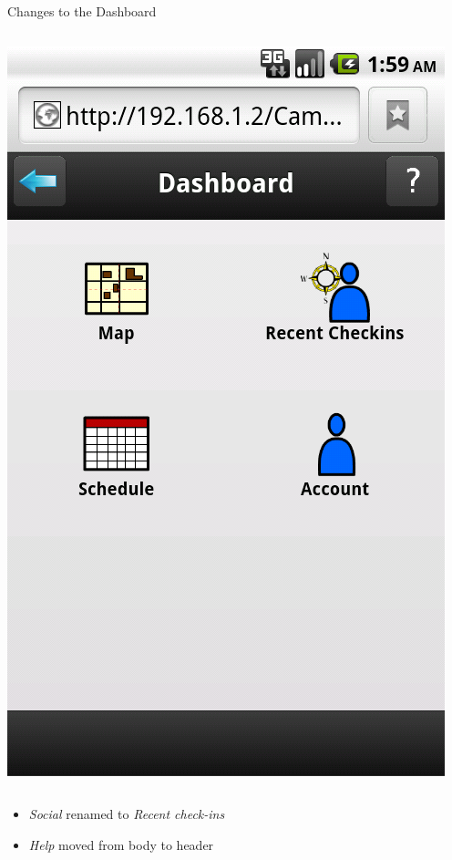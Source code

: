 \documentclass{beamer}
\begin{document}
\begin{frame}{Changes to the Dashboard}
\begin{columns}[c]
        \center\includegraphics[height=0.5 \textheight]{post-heuristic/dashboard.png}
    \end{columns}
    \begin{itemize}
        \item \emph{Social} renamed to \emph{Recent check-ins}
        \item \emph{Help} moved from body to header
    \end{itemize}
\end{frame}
\end{document}
